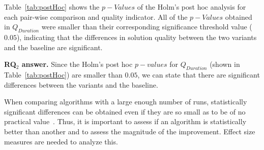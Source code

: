 Table~\ref{tab:postHoc} shows the $p-Values$ of the Holm's post hoc analysis for each pair-wise comparison and quality indicator. All of the $p-Values$ obtained in $Q_{Duration}$ were smaller than their corresponding significance threshold value ($0.05$), indicating that the differences in solution quality between the two variants and the baseline are significant.

\textbf{RQ$_2$ answer. }
Since the Holm's post hoc $p-values$ for $Q_{Duration}$ (shown in Table~\ref{tab:postHoc}) are smaller than $0.05$, we can state that there are significant differences between the variants and the baseline.


When comparing algorithms with a large enough number of runs, statistically significant differences can be obtained even if they are so small as to be of no practical value~\cite{Arcuri2014}. Thus, it is important to assess if an algorithm is statistically better than another and to assess the magnitude of the improvement. Effect size measures are needed to analyze this.



